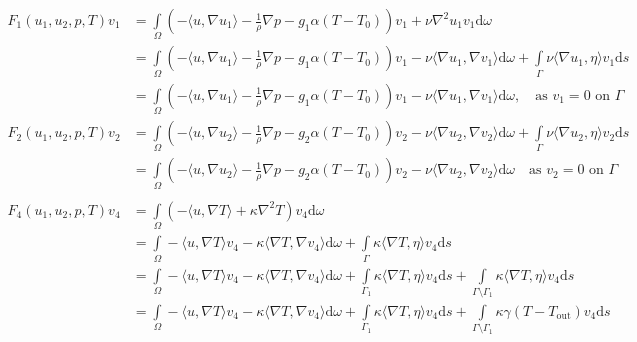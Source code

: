 \documentclass{article}
\begin{document}
 \begin{align*}
 F_1(u_1,u_2,p,T)v_1 &= \int\limits_\Omega \left(-\langle u,\nabla u_1\rangle -\frac{1}{\rho}\nabla p - g_1\alpha (T-T_0)\right)v_1 + \nu \nabla^2 u_1 v_1 \text{d}\omega \\
 &= \int\limits_\Omega \left(-\langle u,\nabla u_1\rangle -\frac{1}{\rho}\nabla p - g_1\alpha (T-T_0)\right)v_1 - \nu \langle \nabla u_1,\nabla v_1 \rangle \text{d}\omega + \int\limits_\Gamma \nu \langle \nabla u_1,\eta\rangle v_1 \text{d}s \\
 &= \int\limits_\Omega \left(-\langle u,\nabla u_1\rangle -\frac{1}{\rho}\nabla p - g_1\alpha (T-T_0)\right)v_1 - \nu \langle \nabla u_1,\nabla v_1 \rangle \text{d}\omega,  \quad \text{as }v_1 = 0 \text{ on } \Gamma \\
 F_2(u_1,u_2,p,T)v_2 &= \int\limits_\Omega \left(-\langle u,\nabla u_2\rangle -\frac{1}{\rho}\nabla p - g_2\alpha (T-T_0)\right)v_2 - \nu \langle \nabla u_2,\nabla v_2 \rangle \text{d}\omega + \int\limits_\Gamma \nu \langle \nabla u_2,\eta\rangle v_2 \text{d}s\\
 &= \int\limits_\Omega \left(-\langle u,\nabla u_2\rangle -\frac{1}{\rho}\nabla p - g_2\alpha (T-T_0)\right)v_2 - \nu \langle \nabla u_2,\nabla v_2 \rangle \text{d}\omega \quad \text{as }v_2 = 0 \text{ on } \Gamma \\\\
 F_4(u_1,u_2,p,T)v_4 &=\int\limits_\Omega \left(-\langle u,\nabla T\rangle+ \kappa \nabla^2 T\right)v_4 \text{d}\omega\\
 &=\int\limits_\Omega -\langle u,\nabla T\rangle v_4 - \kappa \langle\nabla T,\nabla v_4\rangle \text{d}\omega + \int\limits_\Gamma \kappa \langle \nabla T,\eta \rangle v_4\text{d}s\\
 &=\int\limits_\Omega -\langle u,\nabla T\rangle v_4 - \kappa \langle\nabla T,\nabla v_4\rangle \text{d}\omega + \int\limits_{\Gamma_1} \kappa \langle \nabla T,\eta \rangle v_4\text{d}s + \int\limits_{\Gamma \setminus \Gamma_1} \kappa \langle \nabla T,\eta \rangle v_4\text{d}s\\
 &=\int\limits_\Omega -\langle u,\nabla T\rangle v_4 - \kappa \langle\nabla T,\nabla v_4\rangle \text{d}\omega + \int\limits_{\Gamma_1} \kappa \langle \nabla T,\eta \rangle v_4\text{d}s + \int\limits_{\Gamma \setminus \Gamma_1} \kappa \gamma(T-T_\text{out}) v_4\text{d}s\\
 \end{align*}
\end{document}
